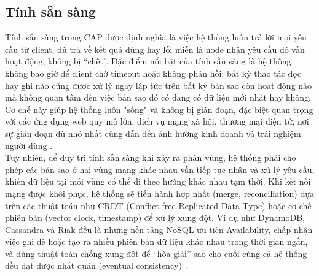 \documentclass[conference]{IEEEtran}
\begin{document}
\subsection{Tính sẵn sàng}
Tính sẵn sàng trong CAP được định nghĩa là việc hệ thống luôn trả lời mọi yêu cầu từ client, dù trả về kết quả đúng hay lỗi miễn là node nhận yêu cầu đó vẫn hoạt động, không bị “chết”. Đặc điểm nổi bật của tính sẵn sàng là hệ thống không bao giờ để client chờ timeout hoặc không phản hồi; bất kỳ thao tác đọc hay ghi nào cũng được xử lý ngay lập tức trên bất kỳ bản sao còn hoạt động nào mà không quan tâm đến việc bản sao đó có đang có dữ liệu mới nhất hay không. Cơ chế này giúp hệ thống luôn "sống" và không bị gián đoạn, đặc biệt quan trọng với các ứng dụng web quy mô lớn, dịch vụ mạng xã hội, thương mại điện tử, nơi sự gián đoạn dù nhỏ nhất cũng dẫn đến ảnh hưởng kinh doanh và trải nghiệm người dùng \cite{brewer}.\\
Tuy nhiên, để duy trì tính sẵn sàng khi xảy ra phân vùng, hệ thống phải cho phép các bản sao ở hai vùng mạng khác nhau vẫn tiếp tục nhận và xử lý yêu cầu, khiến dữ liệu tại mỗi vùng có thể đi theo hướng khác nhau tạm thời. Khi kết nối mạng được khôi phục, hệ thống sẽ tiến hành hợp nhất (merge, reconciliation) dựa trên các thuật toán như CRDT (Conflict-free Replicated Data Type) hoặc cơ chế phiên bản (vector clock, timestamp) để xử lý xung đột. Ví dụ như DynamoDB, Cassandra và Riak đều là những nền tảng NoSQL ưu tiên Availability, chấp nhận việc ghi đè hoặc tạo ra nhiều phiên bản dữ liệu khác nhau trong thời gian ngắn, và dùng thuật toán chống xung đột để “hòa giải” sao cho cuối cùng cả hệ thống đều đạt được nhất quán (eventual consistency) \cite{gilbert,aws,cassandrafb}.\\
\end{document}

